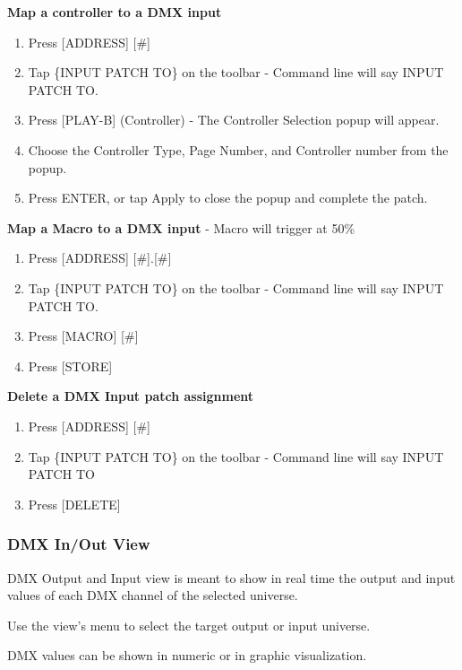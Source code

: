 \documentclass[
]{article}
\begin{document}
\textbf{Map a controller to a DMX input}

\begin{enumerate}
\def\labelenumi{\arabic{enumi}.}
\item
  Press {[}ADDRESS{]} {[}\#{]}
\item
  Tap \{INPUT PATCH TO\} on the toolbar - Command line will say INPUT PATCH TO.
\item
  Press {[}PLAY-B{]} (Controller) - The Controller Selection popup will appear.
\item
  Choose the Controller Type, Page Number, and Controller number from the popup.
\item
  Press ENTER, or tap Apply to close the popup and complete the patch.
\end{enumerate}

\textbf{Map a Macro to a DMX input} - Macro will trigger at 50\%

\begin{enumerate}
\def\labelenumi{\arabic{enumi}.}
\item
  Press {[}ADDRESS{]} {[}\#{]}.{[}\#{]}
\item
  Tap \{INPUT PATCH TO\} on the toolbar - Command line will say INPUT PATCH TO.
\item
  Press {[}MACRO{]} {[}\#{]}
\item
  Press {[}STORE{]}
\end{enumerate}

\textbf{Delete a DMX Input patch assignment}

\begin{enumerate}
\def\labelenumi{\arabic{enumi}.}
\item
  Press {[}ADDRESS{]} {[}\#{]}
\item
  Tap \{INPUT PATCH TO\} on the toolbar - Command line will say INPUT PATCH TO
\item
  Press {[}DELETE{]}
\end{enumerate}

\hypertarget{dmx-inout-view}{%
\subsubsection{DMX In/Out View}\label{dmx-inout-view}}

DMX Output and Input view is meant to show in real time the output and input values of each DMX channel of the selected universe.

Use the view's menu to select the target output or input universe.

DMX values can be shown in numeric or in graphic visualization.
\end{document}

